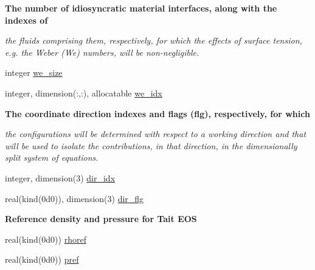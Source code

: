 \begin{Indent}\textbf{ The number of idiosyncratic material interfaces, along with the indexes of}\par
{\em the fluids comprising them, respectively, for which the effects of surface tension, e.\+g. the Weber (We) numbers, will be non-\/negligible. }\begin{DoxyCompactItemize}
\item 
integer \hyperlink{namespacem__global__parameters_af329319354912b90787e0dff7cdc8a37}{we\+\_\+size}
\item 
integer, dimension(\+:,\+:), allocatable \hyperlink{namespacem__global__parameters_a0d20192b0175dc677ba88b14bf0d5104}{we\+\_\+idx}
\end{DoxyCompactItemize}
\end{Indent}
\begin{Indent}\textbf{ The coordinate direction indexes and flags (flg), respectively, for which}\par
{\em the configurations will be determined with respect to a working direction and that will be used to isolate the contributions, in that direction, in the dimensionally split system of equations. }\begin{DoxyCompactItemize}
\item 
integer, dimension(3) \hyperlink{namespacem__global__parameters_a5c017ac8b7bf0d36b4b3b88efe5ffc5f}{dir\+\_\+idx}
\item 
real(kind(0d0)), dimension(3) \hyperlink{namespacem__global__parameters_a9dc07be63393049ae70d9dceeff403e9}{dir\+\_\+flg}
\end{DoxyCompactItemize}
\end{Indent}
\begin{Indent}\textbf{ Reference density and pressure for Tait E\+OS}\par
\begin{DoxyCompactItemize}
\item 
real(kind(0d0)) \hyperlink{namespacem__global__parameters_a485a360d73013d7bce1daa01df404534}{rhoref}
\item 
real(kind(0d0)) \hyperlink{namespacem__global__parameters_aae2170af8a68c7dcdd91910aad867ef4}{pref}
\end{DoxyCompactItemize}
\end{Indent}
